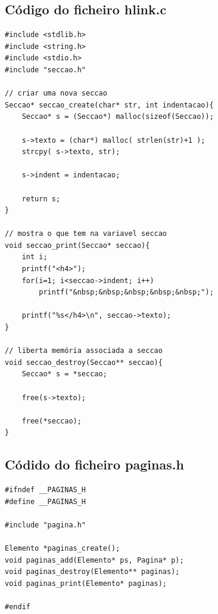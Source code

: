 \documentclass[11pt, a4paper, oneside]{article}
\begin{document}
\subsection{Código do ficheiro hlink.c}
\begin{verbatim}
#include <stdlib.h>
#include <string.h>
#include <stdio.h>
#include "seccao.h"

// criar uma nova seccao
Seccao* seccao_create(char* str, int indentacao){
    Seccao* s = (Seccao*) malloc(sizeof(Seccao));

    s->texto = (char*) malloc( strlen(str)+1 );
    strcpy( s->texto, str);

    s->indent = indentacao;
    
    return s;
}

// mostra o que tem na variavel seccao
void seccao_print(Seccao* seccao){
    int i;
    printf("<h4>");
    for(i=1; i<seccao->indent; i++)
        printf("&nbsp;&nbsp;&nbsp;&nbsp;&nbsp;");

    printf("%s</h4>\n", seccao->texto);
}

// liberta memória associada a seccao
void seccao_destroy(Seccao** seccao){
    Seccao* s = *seccao;

    free(s->texto);

    free(*seccao);
}
\end{verbatim}
\newpage
\subsection{Códido do ficheiro paginas.h}
\begin{verbatim}
#ifndef __PAGINAS_H
#define __PAGINAS_H

#include "pagina.h"

Elemento *paginas_create();
void paginas_add(Elemento* ps, Pagina* p);
void paginas_destroy(Elemento** paginas);
void paginas_print(Elemento* paginas);

#endif

\end{verbatim}

\newpage
\end{document}
